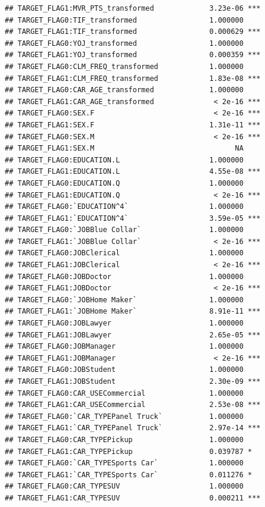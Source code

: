 \documentclass[
]{article}
\begin{document}
\begin{verbatim}
## TARGET_FLAG1:MVR_PTS_transformed             3.23e-06 ***
## TARGET_FLAG0:TIF_transformed                 1.000000    
## TARGET_FLAG1:TIF_transformed                 0.000629 ***
## TARGET_FLAG0:YOJ_transformed                 1.000000    
## TARGET_FLAG1:YOJ_transformed                 0.000359 ***
## TARGET_FLAG0:CLM_FREQ_transformed            1.000000    
## TARGET_FLAG1:CLM_FREQ_transformed            1.83e-08 ***
## TARGET_FLAG0:CAR_AGE_transformed             1.000000    
## TARGET_FLAG1:CAR_AGE_transformed              < 2e-16 ***
## TARGET_FLAG0:SEX.F                            < 2e-16 ***
## TARGET_FLAG1:SEX.F                           1.31e-11 ***
## TARGET_FLAG0:SEX.M                            < 2e-16 ***
## TARGET_FLAG1:SEX.M                                 NA    
## TARGET_FLAG0:EDUCATION.L                     1.000000    
## TARGET_FLAG1:EDUCATION.L                     4.55e-08 ***
## TARGET_FLAG0:EDUCATION.Q                     1.000000    
## TARGET_FLAG1:EDUCATION.Q                      < 2e-16 ***
## TARGET_FLAG0:`EDUCATION^4`                   1.000000    
## TARGET_FLAG1:`EDUCATION^4`                   3.59e-05 ***
## TARGET_FLAG0:`JOBBlue Collar`                1.000000    
## TARGET_FLAG1:`JOBBlue Collar`                 < 2e-16 ***
## TARGET_FLAG0:JOBClerical                     1.000000    
## TARGET_FLAG1:JOBClerical                      < 2e-16 ***
## TARGET_FLAG0:JOBDoctor                       1.000000    
## TARGET_FLAG1:JOBDoctor                        < 2e-16 ***
## TARGET_FLAG0:`JOBHome Maker`                 1.000000    
## TARGET_FLAG1:`JOBHome Maker`                 8.91e-11 ***
## TARGET_FLAG0:JOBLawyer                       1.000000    
## TARGET_FLAG1:JOBLawyer                       2.65e-05 ***
## TARGET_FLAG0:JOBManager                      1.000000    
## TARGET_FLAG1:JOBManager                       < 2e-16 ***
## TARGET_FLAG0:JOBStudent                      1.000000    
## TARGET_FLAG1:JOBStudent                      2.30e-09 ***
## TARGET_FLAG0:CAR_USECommercial               1.000000    
## TARGET_FLAG1:CAR_USECommercial               2.53e-08 ***
## TARGET_FLAG0:`CAR_TYPEPanel Truck`           1.000000    
## TARGET_FLAG1:`CAR_TYPEPanel Truck`           2.97e-14 ***
## TARGET_FLAG0:CAR_TYPEPickup                  1.000000    
## TARGET_FLAG1:CAR_TYPEPickup                  0.039787 *  
## TARGET_FLAG0:`CAR_TYPESports Car`            1.000000    
## TARGET_FLAG1:`CAR_TYPESports Car`            0.011276 *  
## TARGET_FLAG0:CAR_TYPESUV                     1.000000    
## TARGET_FLAG1:CAR_TYPESUV                     0.000211 ***

\end{verbatim}
\end{document}
